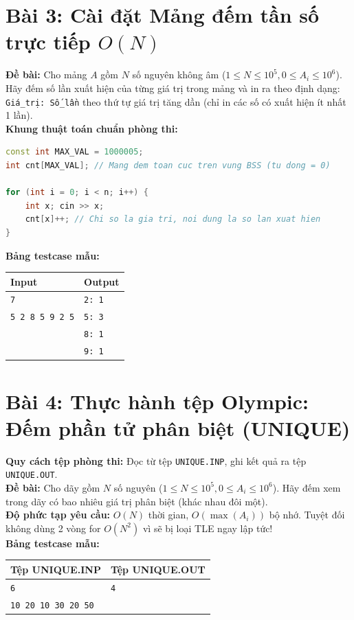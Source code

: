 \documentclass[11pt,a4paper]{article}
\begin{document}
\newpage

\section*{\color{AsianDarkBlue}Bài 3: Cài đặt Mảng đếm tần số trực tiếp $O(N)$}
\textbf{Đề bài:} Cho mảng $A$ gồm $N$ số nguyên không âm ($1 \le N \le 10^5, 0 \le A_i \le 10^6$). Hãy đếm số lần xuất hiện của từng giá trị trong mảng và in ra theo định dạng: \texttt{Giá\_trị: Số\_lần} theo thứ tự giá trị tăng dần (chỉ in các số có xuất hiện ít nhất 1 lần).\\
\textbf{Khung thuật toán chuẩn phòng thi:}
\begin{lstlisting}[language=C++]
const int MAX_VAL = 1000005;
int cnt[MAX_VAL]; // Mang dem toan cuc tren vung BSS (tu dong = 0)

for (int i = 0; i < n; i++) {
    int x; cin >> x;
    cnt[x]++; // Chi so la gia tri, noi dung la so lan xuat hien
}
\end{lstlisting}
\textbf{Bảng testcase mẫu:}
\begin{table}[h!]
\centering\small
\begin{tabular}{|p{7.5cm}|p{7.5cm}|}
\hline
\textbf{Input} & \textbf{Output} \\ \hline
\texttt{7} & \texttt{2: 1} \\
\texttt{5 2 8 5 9 2 5} & \texttt{5: 3} \\
& \texttt{8: 1} \\
& \texttt{9: 1} \\ \hline
\end{tabular}
\end{table}

\section*{\color{AsianDarkBlue}Bài 4: Thực hành tệp Olympic: Đếm phần tử phân biệt (UNIQUE)}
\textbf{Quy cách tệp phòng thi:} Đọc từ tệp \texttt{UNIQUE.INP}, ghi kết quả ra tệp \texttt{UNIQUE.OUT}.\\
\textbf{Đề bài:} Cho dãy gồm $N$ số nguyên ($1 \le N \le 10^5, 0 \le A_i \le 10^6$). Hãy đếm xem trong dãy có bao nhiêu giá trị phân biệt (khác nhau đôi một).\\
\textbf{Độ phức tạp yêu cầu:} $O(N)$ thời gian, $O(\max(A_i))$ bộ nhớ. Tuyệt đối không dùng 2 vòng for $O(N^2)$ vì sẽ bị loại TLE ngay lập tức!\\
\textbf{Bảng testcase mẫu:}
\begin{table}[h!]
\centering\small
\begin{tabular}{|p{7.5cm}|p{7.5cm}|}
\hline
\textbf{Tệp UNIQUE.INP} & \textbf{Tệp UNIQUE.OUT} \\ \hline
\texttt{6} & \texttt{4} \\
\texttt{10 20 10 30 20 50} & \\ \hline
\end{tabular}
\end{table}
\end{document}
